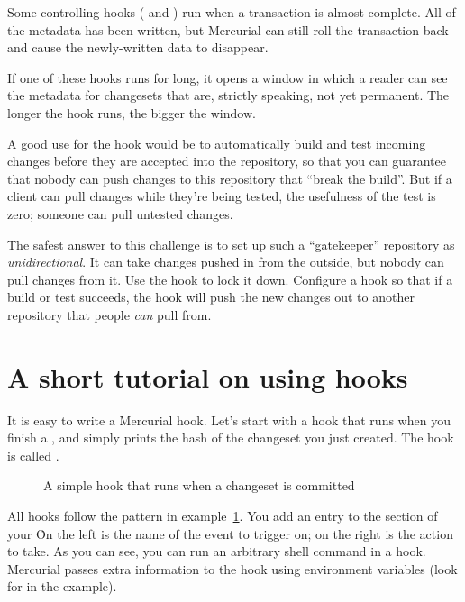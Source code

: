 Some controlling hooks ( and
) run when a transaction is almost complete.
All of the metadata has been written, but Mercurial can still roll the
transaction back and cause the newly-written data to disappear.

If one of these hooks runs for long, it opens a window in which a
reader can see the metadata for changesets that are, strictly
speaking, not yet permanent.  The longer the hook runs, the bigger the
window.

A good use for the  hook would be to
automatically build and test incoming changes before they are accepted
into the repository, so that you can guarantee that nobody can push
changes to this repository that ``break the build''.  But if a client
can pull changes while they're being tested, the usefulness of the
test is zero; someone can pull untested changes.

The safest answer to this challenge is to set up such a ``gatekeeper''
repository as \emph{unidirectional}.  It can take changes pushed in
from the outside, but nobody can pull changes from it.  Use the
 hook to lock it down.  Configure a
 hook so that if a build or test succeeds, the hook
will push the new changes out to another repository that people
\emph{can} pull from.

\section{A short tutorial on using hooks}
\label{sec:hook:simple}

It is easy to write a Mercurial hook.  Let's start with a hook that
runs when you finish a , and simply prints the hash of
the changeset you just created.  The hook is called .

\begin{figure}[ht]
  \caption{A simple hook that runs when a changeset is committed}
  \label{ex:hook:init}
\end{figure}

All hooks follow the pattern in example~\ref{ex:hook:init}.  You add
an entry to the  section of your \hgrc\.  On the left
is the name of the event to trigger on; on the right is the action to
take.  As you can see, you can run an arbitrary shell command in a
hook.  Mercurial passes extra information to the hook using
environment variables (look for  in the example).

